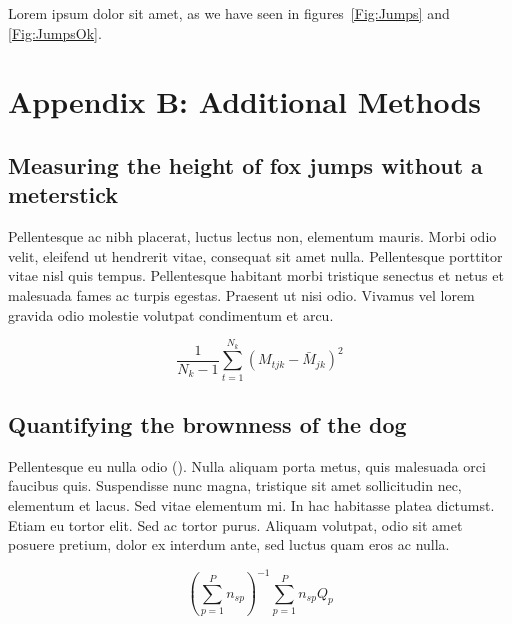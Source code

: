 \documentclass[11pt]{article}
\begin{document}
Lorem ipsum dolor sit amet, as we have seen in figures~\ref{Fig:Jumps} and \ref{Fig:JumpsOk}.

\newpage{}

\section*{Appendix B: Additional Methods}

\subsection*{Measuring the height of fox jumps without a meterstick}

Pellentesque ac nibh placerat, luctus lectus non, elementum mauris.
Morbi odio velit, eleifend ut hendrerit vitae, consequat sit amet
nulla. Pellentesque porttitor vitae nisl quis tempus. Pellentesque
habitant morbi tristique senectus et netus et malesuada fames ac
turpis egestas. Praesent ut nisi odio. Vivamus vel lorem gravida
odio molestie volutpat condimentum et arcu.

\begin{equation}
{ \frac{1}{N_k-1} \sum \limits_{t=1}^{N_k} (M_{tjk} - \bar{M}_{jk})^2}
\end{equation}

\subsection*{Quantifying the brownness of the dog}

Pellentesque eu nulla odio (\citealt{Xiao2015,CookEtAl2015}). Nulla aliquam porta metus, quis malesuada orci faucibus quis. Suspendisse nunc magna, tristique sit amet sollicitudin nec, elementum et lacus. Sed vitae elementum mi. In hac habitasse platea dictumst. Etiam eu tortor elit. Sed ac tortor purus. Aliquam volutpat, odio sit amet posuere pretium, dolor ex interdum ante, sed luctus quam eros ac nulla.

\begin{equation}
{ (\sum \limits_{p=1}^P {n_{sp}})^{-1}\sum \limits_{p=1}^P {n_{sp}Q_{p}}}
\end{equation}

\newpage{}

\end{document}

